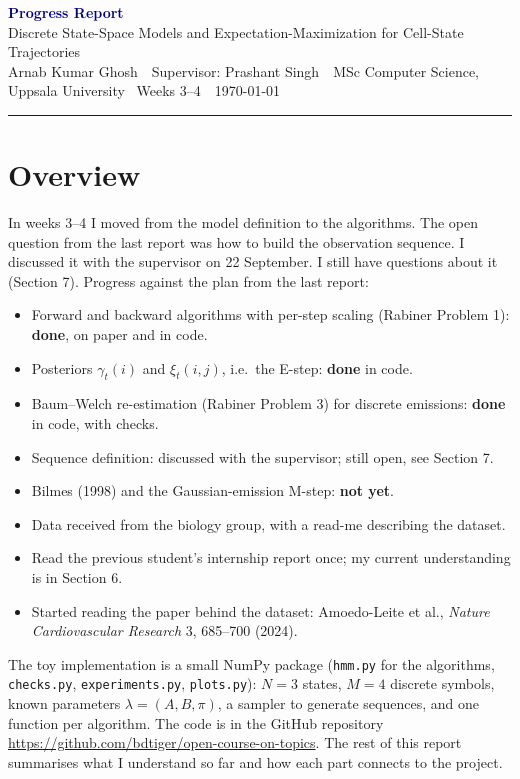 \documentclass[10pt,a4paper]{article}
\newcommand{\myname}{Arnab Kumar Ghosh}
\newcommand{\reporttitle}{Progress Report}
\newcommand{\projecttitle}{Discrete State-Space Models and Expectation-Maximization for Cell-State Trajectories}
\newcommand{\supervisor}{Prashant Singh}
\newcommand{\period}{Weeks 3--4}
\newcommand{\reportdate}{\today}
\begin{document}
\begin{center}
  {\Large\bfseries\textcolor{navy}{\reporttitle}}\\[2pt]
  {\projecttitle}\\[3pt]
  {\small \myname\ \textperiodcentered\ Supervisor: \supervisor\ \textperiodcentered\ MSc Computer Science, Uppsala University \textperiodcentered\ \period\ \textperiodcentered\ \reportdate}
\end{center}
\vspace{-2pt}
\hrule
\vspace{4pt}

\section*{Overview}
In weeks 3--4 I moved from the model definition to the algorithms. The open question from the last report was how to build the observation sequence. I discussed it with the supervisor on 22 September. I still have questions about it (Section 7). Progress against the plan from the last report:

\begin{itemize}
  \item Forward and backward algorithms with per-step scaling (Rabiner Problem 1): \textbf{done}, on paper and in code.
  \item Posteriors $\gamma_t(i)$ and $\xi_t(i,j)$, i.e.\ the E-step: \textbf{done} in code.
  \item Baum--Welch re-estimation (Rabiner Problem 3) for discrete emissions: \textbf{done} in code, with checks.
  \item Sequence definition: discussed with the supervisor; still open, see Section 7.
  \item Bilmes (1998) and the Gaussian-emission M-step: \textbf{not yet}.
  \item Data received from the biology group, with a read-me describing the dataset.
  \item Read the previous student's internship report once; my current understanding is in Section 6.
  \item Started reading the paper behind the dataset: Amoedo-Leite et al., \emph{Nature Cardiovascular Research} 3, 685--700 (2024).
\end{itemize}

The toy implementation is a small NumPy package (\texttt{hmm.py} for the algorithms, \texttt{checks.py}, \texttt{experiments.py}, \texttt{plots.py}): $N = 3$ states, $M = 4$ discrete symbols, known parameters $\lambda = (A, B, \pi)$, a sampler to generate sequences, and one function per algorithm. The code is in the GitHub repository \url{https://github.com/bdtiger/open-course-on-topics}. The rest of this report summarises what I understand so far and how each part connects to the project.
\end{document}
